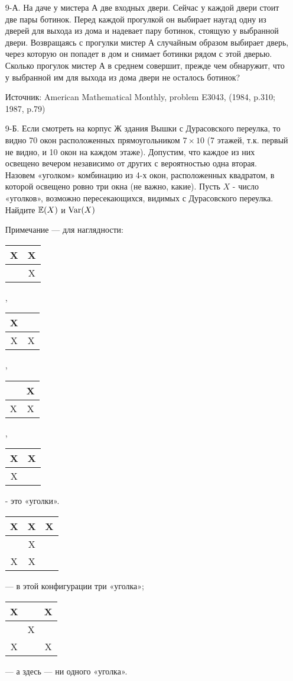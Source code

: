 \begin{enumerate}
\item[9-А.] На даче у мистера А две входных двери. Сейчас у каждой двери стоит две пары ботинок. Перед каждой прогулкой он выбирает наугад одну из дверей для выхода из дома и надевает пару ботинок, стоящую у выбранной двери. Возвращаясь с прогулки мистер А случайным образом выбирает дверь, через которую он попадет в дом и снимает ботинки рядом с этой дверью. Сколько прогулок мистер А в среднем совершит, прежде чем обнаружит, что у выбранной им для выхода из дома двери не осталось ботинок?

Источник: American Mathematical Monthly, problem E3043, (1984, p.310; 1987, p.79)

\item[9-Б.] Если смотреть на корпус Ж здания Вышки с Дурасовского переулка, то видно 70 окон расположенных прямоугольником $7\times 10$ (7 этажей, т.к. первый не видно, и 10 окон на каждом этаже). Допустим, что каждое из них освещено вечером независимо от других с вероятностью одна вторая. Назовем «уголком» комбинацию из 4-х окон, расположенных квадратом, в которой освещено ровно три окна (не важно, какие). Пусть $X$ - число «уголков», возможно пересекающихся, видимых с Дурасовского переулка.
Найдите  $\mathbb{E}(X)$ и $\operatorname{Var}(X)$

Примечание — для наглядности:
\begin{tabular}{|c|c|}
  \hline
  X & X\\
  \hline
    & X \\
  \hline
\end{tabular},
\begin{tabular}{|c|c|}
  \hline
  X & \\
  \hline
  X & X \\
  \hline
\end{tabular},
\begin{tabular}{|c|c|}
  \hline
   & X\\
  \hline
  X & X \\
  \hline
\end{tabular},
\begin{tabular}{|c|c|}
  \hline
  X & X\\
  \hline
  X &  \\
  \hline
\end{tabular} - это «уголки». \\
\begin{tabular}{|c|c|c|}
  \hline
  X & X & X\\
  \hline
    & X & \\
  \hline
  X & X & \\
  \hline

\end{tabular} — в этой конфигурации три «уголка»;
\begin{tabular}{|c|c|c|}
  \hline
  X &  & X\\
  \hline
    & X & \\
  \hline
  X &  & X\\
  \hline

\end{tabular} — а здесь — ни одного «уголка».
\end{enumerate}
